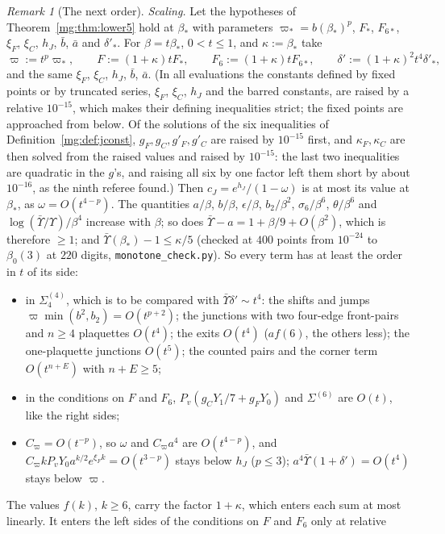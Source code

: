 \documentclass[11pt,a4paper]{article}
\theoremstyle{definition}
\theoremstyle{remark}
\newtheorem{remark}[theorem]{Remark}
\begin{document}
\begin{remark}[The next order]
\emph{Scaling.} Let the hypotheses of Theorem~\ref{mg:thm:lower5} hold at $\beta_*$ with parameters $\varpi_*=b(\beta_*)^p$, $F_*$, $F_{6*}$, $\xi_F$, $\xi_C$, $h_J$, $\bar b$, $\bar a$ and $\delta'_*$.
For $\beta=t\beta_*$, $0<t\le1$, and $\kappa:=\beta_*$ take
\[
\varpi:=t^p\varpi_*,\qquad F:=(1+\kappa)tF_*,\qquad F_6:=(1+\kappa)tF_{6*},\qquad\delta':=(1+\kappa)^2t^4\delta'_*,
\]
and the same $\xi_F$, $\xi_C$, $h_J$, $\bar b$, $\bar a$. (In all evaluations the constants defined by fixed points or by truncated series, $\xi_F$, $\xi_C$, $h_J$ and the barred
constants, are raised by a relative $10^{-15}$, which makes their defining inequalities strict; the fixed points are approached from below. Of the solutions of the six inequalities
of Definition~\ref{mg:def:jconst}, $g_F,g_C,g'_F,g'_C$ are raised by $10^{-15}$ first, and $\kappa_F,\kappa_C$ are then solved from the raised values and raised by $10^{-15}$: the last two
inequalities are quadratic in the $g$'s, and raising all six by one factor left them short by about $10^{-16}$, as the ninth referee found.) Then $c_J=e^{h_J}/(1-\omega)$ is at most its value at $\beta_*$, as $\omega=O(t^{4-p})$. The quantities $a/\beta$, $b/\beta$, $\epsilon/\beta$, $b_2/\beta^2$,
$\sigma_6/\beta^6$, $\theta/\beta^6$ and $\log(\bar\Upsilon/\Upsilon)/\beta^4$ increase with $\beta$; so does $\bar\Upsilon-a=1+\beta/9+O(\beta^2)$, which is therefore $\ge1$; and $\bar\Upsilon(\beta_*)-1\le\kappa/5$ (checked
at $400$ points from $10^{-24}$ to $\beta_0(3)$ at $220$ digits, \texttt{monotone\_check.py}). So every term has at least the order in $t$ of its side:
\begin{itemize}
\item in $\Sigma^{(4)}_4$, which is to be compared with $\bar\Upsilon\delta'\sim t^4$: the shifts and jumps $\varpi\min(b^2,b_2)=O(t^{p+2})$; the junctions with two four-edge front-pairs and
$n\ge4$ plaquettes $O(t^4)$; the exits $O(t^4)$ ($af(6)$, the others less); the one-plaquette junctions $O(t^5)$; the counted pairs and the corner term $O(t^{n+E})$ with $n+E\ge5$;
\item in the conditions on $F$ and $F_6$, $P_v(g_CY_1/7+g_FY_0)$ and $\Sigma^{(6)}$ are $O(t)$, like the right sides;
\item $C_\varpi=O(t^{-p})$, so $\omega$ and $C_\varpi a^4$ are $O(t^{4-p})$, and $C_\varpi kP_vY_0a^{k/2}e^{\xi_Fk}=O(t^{3-p})$ stays below $h_J$ ($p\le3$); $a^4\bar\Upsilon(1+\delta')=O(t^4)$
stays below $\varpi$.
\end{itemize}
The values $f(k)$, $k\ge6$, carry the factor $1+\kappa$, which enters each sum at most linearly. It enters the left sides of the conditions on $F$ and $F_6$ only at relative

\end{remark}
\end{document}

